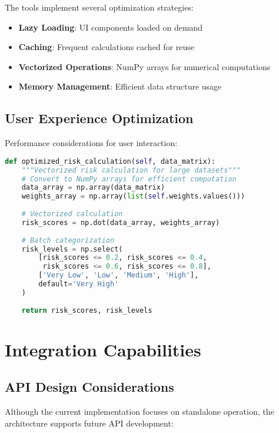 \documentclass[binding=0.6cm]{sapthesis}
\begin{document}
The tools implement several optimization strategies:

\begin{itemize}
    \item \textbf{Lazy Loading}: UI components loaded on demand
    \item \textbf{Caching}: Frequent calculations cached for reuse
    \item \textbf{Vectorized Operations}: NumPy arrays for numerical computations
    \item \textbf{Memory Management}: Efficient data structure usage
\end{itemize}

\subsection{User Experience Optimization}

Performance considerations for user interaction:

\begin{lstlisting}[language=Python, caption=Performance Optimization Example]
def optimized_risk_calculation(self, data_matrix):
    """Vectorized risk calculation for large datasets"""
    # Convert to NumPy arrays for efficient computation
    data_array = np.array(data_matrix)
    weights_array = np.array(list(self.weights.values()))
    
    # Vectorized calculation
    risk_scores = np.dot(data_array, weights_array)
    
    # Batch categorization
    risk_levels = np.select(
        [risk_scores <= 0.2, risk_scores <= 0.4, 
         risk_scores <= 0.6, risk_scores <= 0.8],
        ['Very Low', 'Low', 'Medium', 'High'],
        default='Very High'
    )
    
    return risk_scores, risk_levels
\end{lstlisting}

\section{Integration Capabilities}

\subsection{API Design Considerations}

Although the current implementation focuses on standalone operation, the architecture supports future API development:
\end{document}
